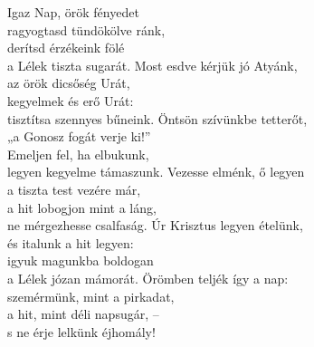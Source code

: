 \documentclass[twoside]{article}
\begin{document}
\begin{hymnstanzas}
    Igaz Nap, örök fényedet\\
    ragyogtasd tündökölve ránk,\\
    derítsd érzékeink fölé\\
    a Lélek tiszta sugarát.
\stanzabreak
    Most esdve kérjük jó Atyánk,\\
    az örök dicsőség Urát,\\
    kegyelmek és erő Urát:\\
    tisztítsa szennyes bűneink.
\stanzabreak
    Öntsön szívünkbe tetterőt,\\
    „a Gonosz fogát verje ki!”\\
    Emeljen fel, ha elbukunk,\\
    legyen kegyelme támaszunk.
\stanzabreak
    Vezesse elménk, ő legyen\\
    a tiszta test vezére már,\\
    a hit lobogjon mint a láng,\\
    ne mérgezhesse csalfaság.
\stanzabreak
    Úr Krisztus legyen ételünk,\\
    és italunk a hit legyen:\\
    igyuk magunkba boldogan\\
    a Lélek józan mámorát.
\stanzabreak
    Örömben teljék így a nap:\\
    szemérmünk, mint a pirkadat,\\
    a hit, mint déli napsugár, –\\
    s ne érje lelkünk éjhomály!
\end{hymnstanzas}



\end{document}
